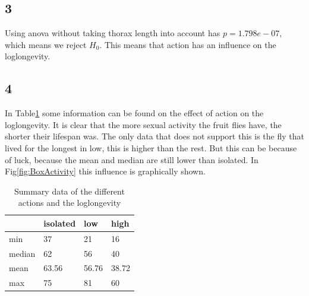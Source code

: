 \documentclass{article}
\begin{document}
    \subsection*{3}
      Using anova without taking thorax length into account has $p=1.798e-07$, which means we reject $H_0$.
      This means that action has an influence on the loglongevity.

    \subsection*{4}
      In Table\ref{table:SumAction} some information can be found on the effect of action on the loglongevity.
      It is clear that the more sexual activity the fruit flies have, the shorter their lifespan was.
      The only data that does not support this is the fly that lived for the longest in low, this is higher than the rest.
      But this can be because of luck, because the mean and median are still lower than isolated.
      In Fig\ref{fig:BoxActivity} this influence is graphically shown.
      \begin{table}[H]
      \begin{center}
      \begin{tabular}{l|lll}
          \hline
                  & isolated& low & high \\
          \hline
          min     & 37      & 21  & 16 \\
          median  & 62      & 56  & 40 \\
          mean    & 63.56   & 56.76 & 38.72  \\
          max     & 75      & 81  & 60 \\
          \hline
      \end{tabular}
      \caption{Summary data of the different actions and the loglongevity}
      \label{table:SumAction}
      \end{center}
      \end{table}
\end{document}
